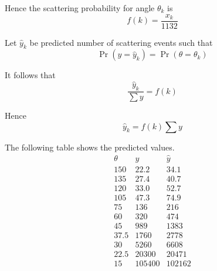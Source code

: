 Hence the scattering probability for angle $\theta_k$ is
\begin{equation*}
f(k)=\frac{x_k}{1132}
\end{equation*}

Let $\hat y_k$ be predicted number of scattering events such that
\begin{equation*}
\Pr(y=\hat y_k)=\Pr(\theta=\theta_k)
\end{equation*}

It follows that
\begin{equation*}
\frac{\hat y_k}{\sum y}=f(k)
\end{equation*}

Hence
\begin{equation*}
\hat y_k=f(k)\sum y
\end{equation*}

The following table shows the predicted values.
\begin{equation*}
\begin{matrix}
\theta & y & \hat y\\
150 & 22.2 & 34.1\\
135 & 27.4 & 40.7\\
120 & 33.0 & 52.7\\
105 & 47.3 & 74.9\\
75 & 136 & 216\\
60 & 320 & 474\\
45 & 989 & 1383\\
37.5 & 1760 & 2778\\
30 & 5260 & 6608\\
22.5 & 20300 & 20471\\
15 & 105400 & 102162
\end{matrix}
\end{equation*}

\iffalse

The coefficient of determination $R^2$ measures how well predicted values fit the data.
\begin{equation*}
R^2=1-\frac{\sum (y-\hat y)^2}{\sum (y-\bar y)^2}=0.998
\end{equation*}

The result indicates that $d\sigma$ explains 99.8\%
of the variance in the data.

\fi


